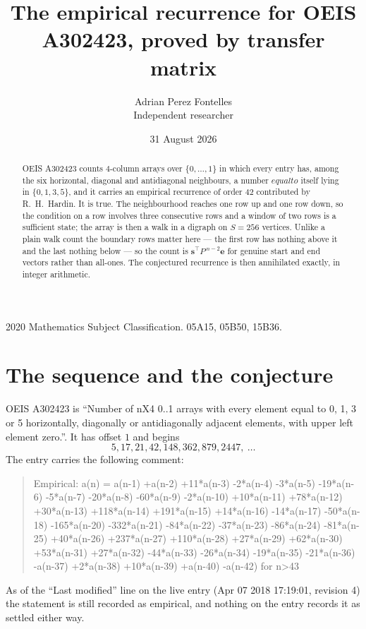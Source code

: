 \documentclass[11pt,a4paper]{article}
\title{The empirical recurrence for OEIS A302423, proved by transfer matrix}
\author{Adrian Perez Fontelles\\ \small Independent researcher}
\date{31 August 2026}
\theoremstyle{plain}
\theoremstyle{definition}
\begin{document}
\maketitle

\begin{abstract}
OEIS A302423 counts $4$-column arrays over $\{0,\dots,1\}$ in which every entry has,
among the six horizontal, diagonal and antidiagonal neighbours, a number $equal to$ itself lying in $\{0,1,3,5\}$, and it carries an empirical
recurrence of order $42$ contributed by R.~H.~Hardin. It is true. The neighbourhood
reaches one row up and one row down, so the condition on a row involves three consecutive
rows and a window of two rows is a sufficient state; the array is then a walk in a digraph
on $S=256$ vertices. Unlike a plain walk count the boundary rows matter here --- the first
row has nothing above it and the last nothing below --- so the count is
$\mathbf{s}^{\!\top}P^{\,n-2}\mathbf{e}$ for genuine start and end vectors rather than
all-ones. The conjectured recurrence is then annihilated exactly, in integer arithmetic.
\end{abstract}

\noindent\small 2020 Mathematics Subject Classification. 05A15, 05B50, 15B36.\normalsize

\section{The sequence and the conjecture}

OEIS A302423 is ``Number of nX4 0..1 arrays with every element equal to 0, 1, 3 or 5 horizontally, diagonally or antidiagonally adjacent elements, with upper left element zero.''. It has offset
$1$ and begins
\[
5, 17, 21, 42, 148, 362, 879, 2447,\ \dots
\]
The entry carries the following comment:
\begin{quote}\small
Empirical: a(n) = a(n-1) +a(n-2) +11*a(n-3) -2*a(n-4) -3*a(n-5) -19*a(n-6) -5*a(n-7) -20*a(n-8) -60*a(n-9) -2*a(n-10) +10*a(n-11) +78*a(n-12) +30*a(n-13) +118*a(n-14) +191*a(n-15) +14*a(n-16) -14*a(n-17) -50*a(n-18) -165*a(n-20) -332*a(n-21) -84*a(n-22) -37*a(n-23) -86*a(n-24) -81*a(n-25) +40*a(n-26) +237*a(n-27) +110*a(n-28) +27*a(n-29) +62*a(n-30) +53*a(n-31) +27*a(n-32) -44*a(n-33) -26*a(n-34) -19*a(n-35) -21*a(n-36) -a(n-37) +2*a(n-38) +10*a(n-39) +a(n-40) -a(n-42) for n>43
\end{quote}
As of the ``Last modified'' line on the live entry (Apr 07 2018 17:19:01, revision
4) the statement is still recorded as empirical, and nothing on the entry
records it as settled either way.
\end{document}
